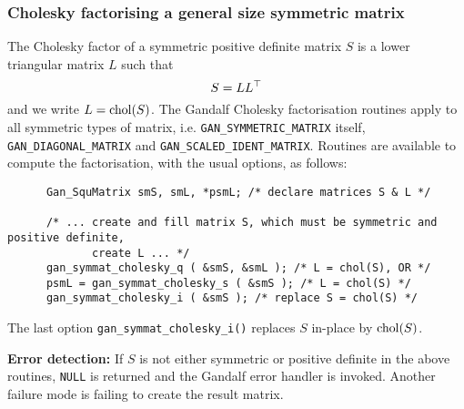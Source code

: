 \subsubsection{Cholesky factorising a general size symmetric matrix}
The Cholesky factor of a symmetric positive definite matrix $S$ is
a lower triangular matrix $L$ such that
\[ S = L L^{\top}
\]
and we write $L={\rm chol}(S)$.
The Gandalf Cholesky factorisation routines apply to all symmetric types
of matrix, i.e. {\tt GAN\_SYMMETRIC\_MATRIX} itself,
{\tt GAN\_DIAGONAL\_MATRIX} and {\tt GAN\_SCALED\_IDENT\_MATRIX}.
Routines are available to compute the factorisation, with the usual options,
as follows:
\begin{verbatim}
      Gan_SquMatrix smS, smL, *psmL; /* declare matrices S & L */

      /* ... create and fill matrix S, which must be symmetric and positive definite,
             create L ... */
      gan_symmat_cholesky_q ( &smS, &smL ); /* L = chol(S), OR */
      psmL = gan_symmat_cholesky_s ( &smS ); /* L = chol(S) */
      gan_symmat_cholesky_i ( &smS ); /* replace S = chol(S) */
\end{verbatim}
The last option {\tt gan\_symmat\_cholesky\_i()} replaces $S$ in-place
by ${\rm chol}(S)$.

{\bf Error detection:} If $S$ is not either symmetric or positive definite
in the above routines, {\tt NULL} is returned and the Gandalf error handler
is invoked. Another failure mode is failing to create the result matrix.

